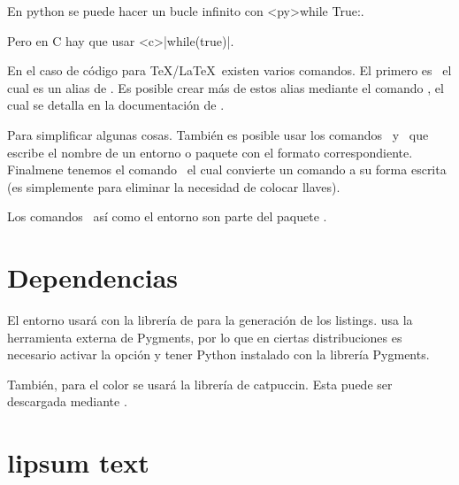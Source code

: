 \documentclass[theme=mocha, pagecolor=true, pagesize=a5paper]{qx-files/qx-notes}
\begin{document}
  \begin{texexample}
    En python se puede hacer un bucle infinito con 
    \codeline<py>{while True:}.

    Pero en C hay que usar \codeline<c>|while(true){}|.
  \end{texexample}


  En el caso de código para \TeX/\LaTeX\ existen varios comandos. El primero es \texcs\texline\ el cual es un alias de . Es posible crear más de estos alias mediante el comando \texcs\newmintinline, el cual se detalla en la documentación de .

  Para simplificar algunas cosas. También es posible usar los comandos \texcs\texenvname\ y \texcs\texpkgname\ que escribe el nombre de un entorno o paquete con el formato correspondiente. Finalmene tenemos el comando \texcs\texcs\ el cual convierte un comando a su forma escrita (es simplemente para eliminar la necesidad de colocar llaves).

  \begin{texexample}
    Los comandos \texcs\mint\ así como el entorno
     son parte del paquete .
  \end{texexample}

  \section{Dependencias}

  El entorno  usará  con la librería de  para la generación de los listings.  usa la herramienta externa de Pygments, por lo que en ciertas distribuciones es necesario activar la opción  y tener Python instalado con la librería Pygments.

  También, para el color se usará la librería de catpuccin. Esta puede ser descargada mediante .




  \section{lipsum text}

  \lipsum
\end{document}
